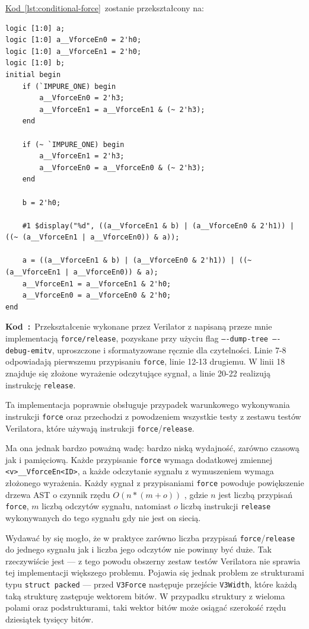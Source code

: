 \documentclass[shortabstract, inz]{iithesis}
\newcounter{kod}[chapter]
\renewcommand{\thekod}{\thechapter\arabic{kod}}
\newcommand{\codecaption}[2]{%
  \par\refstepcounter{kod}\label{#1}%
  \noindent\textbf{Kod~\thekod:}~#2\par
  \vspace*{1.0\baselineskip}%
}
\newcommand{\coderef}[1]{\hyperref[#1]{Kod~\ref*{#1}}}
\begin{document}
\coderef{lst:conditional-force}~zostanie przekształcony na:
\begin{verbatim}
logic [1:0] a;
logic [1:0] a__VforceEn0 = 2'h0;
logic [1:0] a__VforceEn1 = 2'h0;
logic [1:0] b;
initial begin
    if (`IMPURE_ONE) begin
        a__VforceEn0 = 2'h3;
        a__VforceEn1 = a__VforceEn1 & (~ 2'h3);
    end

    if (~ `IMPURE_ONE) begin
        a__VforceEn1 = 2'h3;
        a__VforceEn0 = a__VforceEn0 & (~ 2'h3);
    end

    b = 2'h0;

    #1 $display("%d", ((a__VforceEn1 & b) | (a__VforceEn0 & 2'h1)) | ((~ (a__VforceEn1 | a__VforceEn0)) & a));

    a = ((a__VforceEn1 & b) | (a__VforceEn0 & 2'h1)) | ((~ (a__VforceEn1 | a__VforceEn0)) & a);
    a__VforceEn1 = a__VforceEn1 & 2'h0;
    a__VforceEn0 = a__VforceEn0 & 2'h0;
end
\end{verbatim}
\codecaption{lst:force-ast}{Przekształcenie wykonane przez Verilator z napisaną przeze mnie implementacją \texttt{force/release}, pozyskane przy użyciu flag \texttt{----dump-tree ----debug-emitv}, uproszczone i sformatyzowane ręcznie dla czytelności. Linie 7-8 odpowiadają pierwszemu przypisaniu \texttt{force}, linie 12-13 drugiemu. W linii 18 znajduje się złożone wyrażenie odczytujące sygnał, a linie 20-22 realizują instrukcję \texttt{release}.}

Ta implementacja poprawnie obsługuje przypadek warunkowego wykonywania instrukcji \texttt{force} oraz przechodzi z powodzeniem wszystkie testy z zestawu testów Verilatora, które używają instrukcji \texttt{force}/\texttt{release}.

Ma ona jednak bardzo poważną wadę: bardzo niską wydajność, zarówno czasową jak i pamięciową. Każde przypisanie \texttt{force} wymaga dodatkowej zmiennej \linebreak \texttt{<v>\_\_VforceEn<ID>}, a każde odczytanie sygnału z wymuszeniem wymaga złożonego wyrażenia. Każdy sygnał z przypisaniami \texttt{force} powoduje powiększenie drzewa AST o czynnik rzędu $O(n*(m+o))$ , gdzie $n$ jest liczbą przypisań \texttt{force}, $m$ liczbą odczytów sygnału, natomiast $o$ liczbą instrukcji \texttt{release} wykonywanych do tego sygnału gdy nie jest on siecią.

Wydawać by się mogło, że w praktyce zarówno liczba przypisań \texttt{force}/\texttt{release} do jednego sygnału jak i liczba jego odczytów nie powinny być duże. Tak rzeczywiście jest --- z tego powodu obszerny zestaw testów Verilatora nie sprawia tej implementacji większego problemu. Pojawia się jednak problem ze strukturami typu \texttt{struct packed} --- przed \texttt{V3Force} następuje przejście \texttt{V3Width}, które każdą taką strukturę zastępuje wektorem bitów. W przypadku struktury z wieloma polami oraz podstrukturami, taki wektor bitów może osiągać szerokość rzędu dziesiątek tysięcy bitów.
\end{document}
